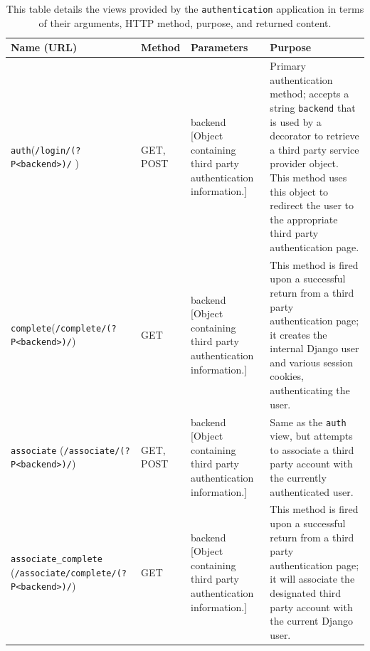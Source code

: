 \begin{table}[htb]
    \caption[Views provided by {\tt authentication} subsystem]{
	This table details the views provided by the {\tt authentication} application in terms of their arguments, HTTP method, purpose, and returned content.
	}
    \small
    \begin{center}
    \begin{tabularx}{ \textwidth}{| p{3cm} | p{1.2cm} | p{4cm} | X | } 
    \hline
    	Name (URL) & Method & Parameters & Purpose \\  \hline \hline

	{\tt auth}\textasteriskcentered \newline ({\tt /login/\newline(?P<backend>)/} )& GET, POST & backend [Object containing third party authentication information.] & Primary authentication method; accepts a string {\tt backend} that is used by a decorator to retrieve a third party service provider object.  This method uses this object to redirect the user to the appropriate third party authentication page.\\ \hline
	{\tt complete}\textasteriskcentered \newline ({\tt /complete/\newline(?P<backend>)/}) & GET & backend [Object containing third party authentication information.] & This method is fired upon a successful return from a third party authentication page; it creates the internal Django user and various session cookies, authenticating the user. \\ \hline
	{\tt associate} \textasteriskcentered \newline ({\tt /associate/\newline(?P<backend>)/}) & GET, POST &  backend [Object containing third party authentication information.] & Same as the {\tt auth} view, but attempts to associate a third party account with the currently authenticated user. \\ \hline
	{\tt associate_complete} \textasteriskcentered \newline ({\tt /associate/\newline complete/\newline(?P<backend>)/}) & GET &  backend [Object containing third party authentication information.] & This method is fired upon a successful return from a third party authentication page; it will associate the designated third party account with the current Django user. \\ \hline

\end{tabularx}
\end{center}
\end{table}
